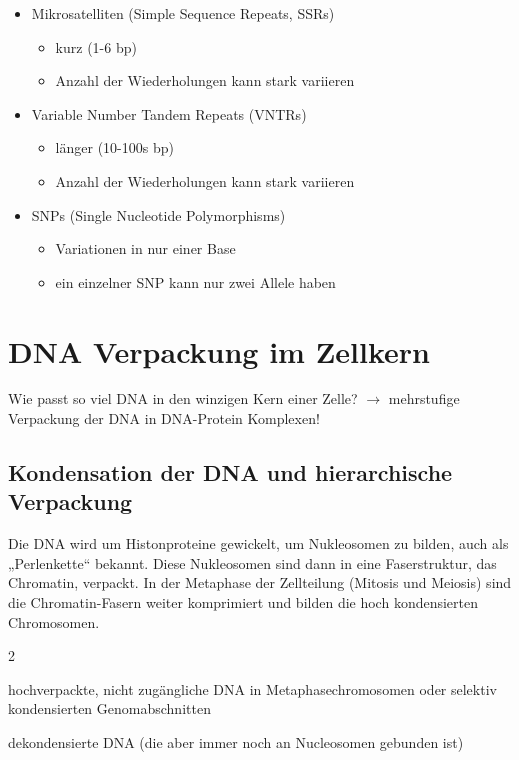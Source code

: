 \documentclass{article}
\begin{document}
\begin{itemize}
    \item Mikrosatelliten (Simple Sequence Repeats, SSRs)
    \begin{itemize}
        \item kurz (1-6 bp)
        \item Anzahl der Wiederholungen kann stark variieren
    \end{itemize}
    \item Variable Number Tandem Repeats (VNTRs)
    \begin{itemize}
        \item länger (10-100s bp)
        \item Anzahl der Wiederholungen kann stark variieren
    \end{itemize}
    \item SNPs (Single Nucleotide Polymorphisms)
    \begin{itemize}
        \item Variationen in nur einer Base
        \item ein einzelner SNP kann nur zwei Allele haben
    \end{itemize}
\end{itemize}
\section*{DNA Verpackung im Zellkern}
Wie passt so viel DNA in den
winzigen Kern einer Zelle? \newline
$\rightarrow$ mehrstufige Verpackung der DNA in DNA-Protein Komplexen!
\subsection*{Kondensation der DNA und hierarchische Verpackung}
Die DNA wird um Histonproteine gewickelt, um Nukleosomen zu bilden, auch als „Perlenkette“ bekannt. Diese Nukleosomen sind dann in eine Faserstruktur, das Chromatin, verpackt. \newline
In der Metaphase der Zellteilung (Mitosis und Meiosis) sind die Chromatin-Fasern weiter komprimiert und bilden die hoch kondensierten Chromosomen.
\begin{multicols}{2}
\begin{mybox}[title={Heterochromatin}]
hochverpackte, nicht zugängliche DNA in
Metaphasechromosomen oder selektiv kondensierten
Genomabschnitten
\end{mybox}
\columnbreak 
\begin{mybox}[title={Euchromatin}]
dekondensierte DNA (die aber immer noch an
Nucleosomen gebunden ist)
\end{mybox}
\end{multicols}
\end{document}
